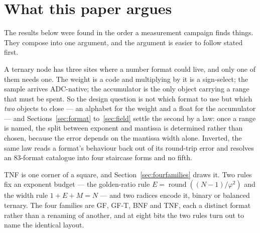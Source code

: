 \documentclass[11pt]{article}
\theoremstyle{definition}
\begin{document}
\begin{abstract}
\textbf{At matched physical width the comparison is negative.} Computed from
the committed reference implementations, posit holds more representable values
than TNF and a finer step at unity at every width the ladder occupies --- $12\times$
finer at 19 bits, $4\times$ at 10, $2\times$ at 6 --- and posit with $es{=}2$ weakly
dominates on both coordinates at all three. A ternary exponent does not tile a
binary field: four trits use $81$ of $128$ codes, leaving $8{,}190$ of the $2^{19}$
words unreachable. The no-survivors corollary is accordingly withdrawn to a
matched-\emph{name} claim (Section~\ref{sec:matchedwidth}). The case for this
format was never precision per bit; it is multiplier removal, decode cost and the
rungs where nothing else trains.

Section~\ref{sec:selfcheck} sets out the ways a format comparison fails while
each of its measurements is correct, since every quantitative claim above depends
on those failures having been ruled out.
\end{abstract}

\section{What this paper argues}
\label{sec:roadmap}

The results below were found in the order a measurement campaign finds things.
They compose into one argument, and the argument is easier to follow stated
first.

A ternary node has three sites where a number format could live, and only one of
them needs one. The weight is a code and multiplying by it is a sign-select; the
sample arrives ADC-native; the accumulator is the only object carrying a range
that must be spent. So the design question is not which format to use but which
\emph{two} objects to close --- an alphabet for the weight and a float for the
accumulator --- and Sections~\ref{sec:format} to~\ref{sec:field} settle the
second by a law: once a range is named, the split between exponent and mantissa
is determined rather than chosen, because the error depends on the mantissa
width alone. Inverted, the same law reads a format's behaviour back out of its
round-trip error and resolves an 83-format catalogue into four staircase forms
and no fifth.

TNF is one corner of a square, and Section~\ref{sec:fourfamilies} draws it. Two
rules fix an exponent budget --- the golden-ratio rule
$E=\operatorname{round}((N-1)/\varphi^{2})$ and the width rule $1+E+M=N$ --- and
two radices encode it, binary or balanced ternary. The four families are GF,
GF-T, BNF and TNF, each a distinct format rather than a renaming of another, and
at eight bits the two rules turn out to name the identical layout.
\end{document}

